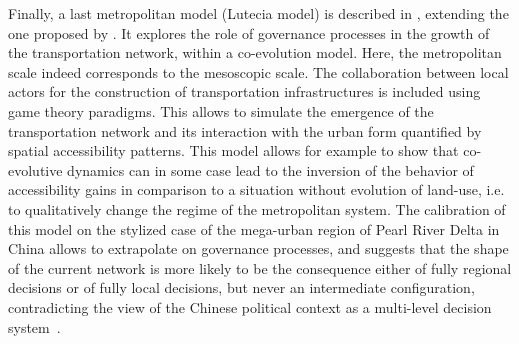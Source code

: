 \documentclass[11pt]{article}
\begin{document}
Finally, a last metropolitan model (Lutecia model) is described in \cite{raimbault2018caracterisation}, extending the one proposed by \citep{lenechet:halshs-01272236}. It explores the role of governance processes in the growth of the transportation network, within a co-evolution model. Here, the metropolitan scale indeed corresponds to the mesoscopic scale. The collaboration between local actors for the construction of transportation infrastructures is included using game theory paradigms. This allows to simulate the emergence of the transportation network and its interaction with the urban form quantified by spatial accessibility patterns. This model allows for example to show that co-evolutive dynamics can in some case lead to the inversion of the behavior of accessibility gains in comparison to a situation without evolution of land-use, i.e. to qualitatively change the regime of the metropolitan system. The calibration of this model on the stylized case of the mega-urban region of Pearl River Delta in China allows to extrapolate on governance processes, and suggests that the shape of the current network is more likely to be the consequence either of fully regional decisions or of fully local decisions, but never an intermediate configuration, contradicting the view of the Chinese political context as a multi-level decision system~\citep{liao2017ouverture}.
\end{document}
